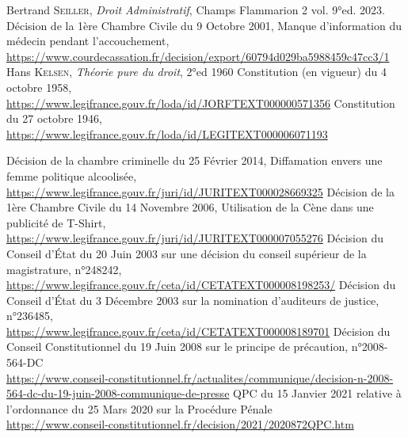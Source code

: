 \documentclass[math]{cours}
\begin{document}
\newpage
{}

\begin{thebibliography}{255}
		Bertrand \textsc{Seiller}, \textit{Droit Administratif}, Champs Flammarion 2 vol. 9°ed. 2023.
		Décision de la 1ère Chambre Civile du 9 Octobre 2001, Manque d'information du médecin pendant l'accouchement,\\
		\url{https://www.courdecassation.fr/decision/export/60794d029ba5988459c47cc3/1}
		Hans \textsc{Kelsen}, \textit{Théorie pure du droit}, 2°ed 1960
		Constitution (en vigueur) du 4 octobre 1958,\\
		\url{https://www.legifrance.gouv.fr/loda/id/JORFTEXT000000571356}
		Constitution du 27 octobre 1946,\\
		\url{https://www.legifrance.gouv.fr/loda/id/LEGITEXT000006071193}

		Décision de la chambre criminelle du 25 Février 2014, Diffamation envers une femme politique alcoolisée,\\
		\url{https://www.legifrance.gouv.fr/juri/id/JURITEXT000028669325}
		Décision de la 1ère Chambre Civile du 14 Novembre 2006, Utilisation de la Cène dans une publicité de T-Shirt,\\
		\url{https://www.legifrance.gouv.fr/juri/id/JURITEXT000007055276}
		Décision du Conseil d'État du 20 Juin 2003 sur une décision du conseil supérieur de la magistrature, n°248242,\\
		\url{https://www.legifrance.gouv.fr/ceta/id/CETATEXT000008198253/}
		Décision du Conseil d'État du 3 Décembre 2003 sur la nomination d'auditeurs de justice, n°236485,\\
		\url{https://www.legifrance.gouv.fr/ceta/id/CETATEXT000008189701}
		Décision du Conseil Constitutionnel du 19 Juin 2008 sur le principe de précaution, n°2008-564-DC\\
		\url{https://www.conseil-constitutionnel.fr/actualites/communique/decision-n-2008-564-dc-du-19-juin-2008-communique-de-presse}
		QPC du 15 Janvier 2021 relative à l'ordonnance du 25 Mars 2020 sur la Procédure Pénale\\
		\url{https://www.conseil-constitutionnel.fr/decision/2021/2020872QPC.htm}
\end{thebibliography}
\end{document}
